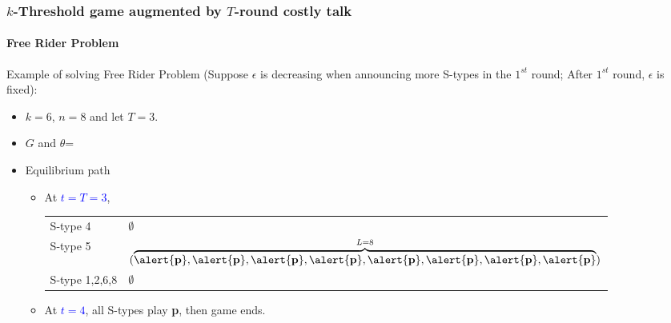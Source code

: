 \documentclass[9pt,handout]{beamer}
\begin{document}
\begin{frame}
  \frametitle{$k$-Threshold game augmented by $T$-round costly talk}
  \framesubtitle{Free Rider Problem}
Example of solving Free Rider Problem (Suppose $\epsilon$ \alert{is decreasing} when announcing \alert{more} S-types in the \alert{$1^{st}$} round; After $1^{st}$ round, $\epsilon$ is fixed):
\begin{itemize}
\item $k=6$, $n=8$ and let $T=3$.
\item $G$ and $\theta$=
\begin{center}
\end{center}
\end{itemize}

\begin{itemize}
\item Equilibrium path
\begin{itemize}
\item 

At \textcolor{blue}{$t=T=3$}, 
\begin{table}[h]
\begin{tabular}{ll }
S-type 4 & $\emptyset$\\
S-type 5 & $(\overbrace{\alert{\textbf{p}},\alert{\textbf{p}},\alert{\textbf{p}},\alert{\textbf{p}},\alert{\textbf{p}},\alert{\textbf{p}},\alert{\textbf{p}},\alert{\textbf{p}}}^{L=8})$\\
S-type 1,2,6,8 & $\emptyset$
\end{tabular}
\end{table}

\pause
\item At \textcolor{blue}{$t=4$}, all S-types play \textbf{p}, then game ends.

\end{itemize}

\end{itemize}



\end{frame}
\end{document}
